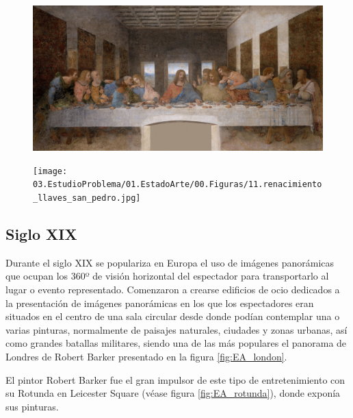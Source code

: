 \begin{figure}
\centering
\begin{minipage}{.5\textwidth}
  \centering
  \includegraphics[width=.9\linewidth]{03.EstudioProblema/01.EstadoArte/00.Figuras/10.renacimiento_ultima_cena.jpg}
  \label{fig:EA_cenaLeonardo}
\end{minipage}%
\begin{minipage}{.5\textwidth}
  \centering
  \texttt{[image: 03.EstudioProblema/01.EstadoArte/00.Figuras/11.renacimiento\_llaves\_san\_pedro.jpg]}
  \label{fig:EA_llaves}
\end{minipage}
\end{figure}






\subsection{Siglo XIX}

Durante el siglo XIX se populariza en Europa el uso de imágenes panorámicas que ocupan los 360º de visión horizontal del espectador para transportarlo al lugar o evento representado. \cite{EA_vr_panorama} Comenzaron a crearse edificios de ocio dedicados a la presentación de imágenes panorámicas en los que los espectadores eran situados en el centro de una sala circular desde donde podían contemplar una o varias pinturas, normalmente de paisajes naturales, ciudades y zonas urbanas, así como grandes batallas militares, siendo una de las más populares el panorama de Londres de Robert Barker presentado en la figura \ref{fig:EA_london}.

El pintor Robert Barker fue el gran impulsor de este tipo de entretenimiento con su Rotunda en Leicester Square (véase figura \ref{fig:EA_rotunda}), donde exponía sus pinturas.



